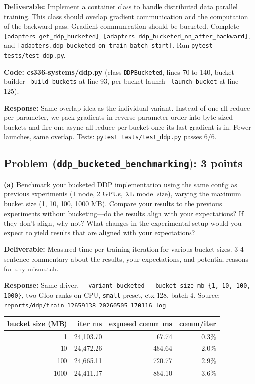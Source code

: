 \documentclass[11pt]{article}
\begin{document}
\textbf{Deliverable:} Implement a container class to handle distributed data parallel training. This class should overlap gradient communication and the computation of the backward pass. Gradient communication should be bucketed. Complete \texttt{[adapters.get\_ddp\_bucketed]}, \texttt{[adapters.ddp\_bucketed\_on\_after\_backward]}, and \texttt{[adapters.ddp\_bucketed\_on\_train\_batch\_start]}. Run \texttt{pytest tests/test\_ddp.py}.

\textbf{Code: cs336-systems/ddp.py} (class \verb|DDPBucketed|, lines 70 to 140, bucket builder \verb|_build_buckets| at line 93, per bucket launch \verb|_launch_bucket| at line 125).

\textbf{Response:} Same overlap idea as the individual variant. Instead of one all reduce per parameter, we pack gradients in reverse parameter order into byte sized buckets and fire one async all reduce per bucket once its last gradient is in. Fewer launches, same overlap. Tests: \verb|pytest tests/test_ddp.py| passes 6/6.

\subsection*{Problem (\texttt{ddp\_bucketed\_benchmarking}): 3 points}

\textbf{(a)} Benchmark your bucketed DDP implementation using the same config as previous experiments (1 node, 2 GPUs, XL model size), varying the maximum bucket size (1, 10, 100, 1000 MB). Compare your results to the previous experiments without bucketing---do the results align with your expectations? If they don't align, why not? What changes in the experimental setup would you expect to yield results that are aligned with your expectations?

\textbf{Deliverable:} Measured time per training iteration for various bucket sizes. 3-4 sentence commentary about the results, your expectations, and potential reasons for any mismatch.

\textbf{Response:}
Same driver, \verb|--variant bucketed --bucket-size-mb {1, 10, 100, 1000}|, two Gloo ranks on CPU, \texttt{small} preset, ctx 128, batch 4. Source: \verb|reports/ddp/train-12659138-20260505-170116.log|.

\begin{table}[H]
\centering\small
\begin{tabular}{rrrr}
\toprule
bucket size (MB) & iter ms & exposed comm ms & comm/iter \\
\midrule
   1 & 24{,}103.70 &  67.74 & 0.3\% \\
  10 & 24{,}472.26 & 484.64 & 2.0\% \\
 100 & 24{,}665.11 & 720.77 & 2.9\% \\
1000 & 24{,}411.07 & 884.10 & 3.6\% \\
\bottomrule
\end{tabular}
\end{table}
\end{document}
